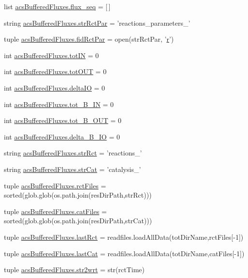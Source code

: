 \begin{DoxyCompactItemize}
\item 
list \hyperlink{a00124_a99cfaccf97d11133896704acd137057d}{acs\-Buffered\-Fluxes.\-flux\-\_\-seq} = \mbox{[}$\,$\mbox{]}
\item 
string \hyperlink{a00124_ac571c8d78a216f58ebc1e37bef25a541}{acs\-Buffered\-Fluxes.\-str\-Rct\-Par} = 'reactions\-\_\-parameters\-\_\-'
\item 
tuple \hyperlink{a00124_af949c46aab0625cd7bbed10b8a484f8b}{acs\-Buffered\-Fluxes.\-fid\-Rct\-Par} = open(str\-Rct\-Par, '\hyperlink{a00031_ac862e7284527eb913b1351c8bfb8e079}{r}')
\item 
int \hyperlink{a00124_a59bf56491943c5f1414e0cc407b48b93}{acs\-Buffered\-Fluxes.\-tot\-I\-N} = 0
\item 
int \hyperlink{a00124_a730efee103fd41819ea5848cec249d07}{acs\-Buffered\-Fluxes.\-tot\-O\-U\-T} = 0
\item 
int \hyperlink{a00124_ae98d1ab06ff5af93de3e406b69c0f890}{acs\-Buffered\-Fluxes.\-delta\-I\-O} = 0
\item 
int \hyperlink{a00124_a9212bb73d018f7f9c7112fc40900335c}{acs\-Buffered\-Fluxes.\-tot\-\_\-\-B\-\_\-\-I\-N} = 0
\item 
int \hyperlink{a00124_a05f604fc532aebf8d9418c9162e2c1b7}{acs\-Buffered\-Fluxes.\-tot\-\_\-\-B\-\_\-\-O\-U\-T} = 0
\item 
int \hyperlink{a00124_a28922506bb13e58a9c49c9191dee3784}{acs\-Buffered\-Fluxes.\-delta\-\_\-\-B\-\_\-\-I\-O} = 0
\item 
string \hyperlink{a00124_a8a10e31ae1f56ead45ef13fe84ba868f}{acs\-Buffered\-Fluxes.\-str\-Rct} = 'reactions\-\_\-'
\item 
string \hyperlink{a00124_acbfee694f1d4745446ad7ed83d1f7494}{acs\-Buffered\-Fluxes.\-str\-Cat} = 'catalysis\-\_\-'
\item 
tuple \hyperlink{a00124_a60a2c6fa1b6a8c5d40a751491ffd04e7}{acs\-Buffered\-Fluxes.\-rct\-Files} = sorted(glob.\-glob(os.\-path.\-join(res\-Dir\-Path,str\-Rct)))
\item 
tuple \hyperlink{a00124_a1d925f94f070fbec1b39c544176b3452}{acs\-Buffered\-Fluxes.\-cat\-Files} = sorted(glob.\-glob(os.\-path.\-join(res\-Dir\-Path,str\-Cat)))
\item 
tuple \hyperlink{a00124_a3f5f644008584b4ae3756ada869a8f03}{acs\-Buffered\-Fluxes.\-last\-Rct} = readfiles.\-load\-All\-Data(tot\-Dir\-Name,rct\-Files\mbox{[}-\/1\mbox{]})
\item 
tuple \hyperlink{a00124_a4b8fcacfa4d1a00c44c22118ca07688a}{acs\-Buffered\-Fluxes.\-last\-Cat} = readfiles.\-load\-All\-Data(tot\-Dir\-Name,cat\-Files\mbox{[}-\/1\mbox{]})
\item 
tuple \hyperlink{a00124_ae3cf837e258f4b4c7f2d2b1118d2ae65}{acs\-Buffered\-Fluxes.\-str2wrt} = str(rct\-Time)
\end{DoxyCompactItemize}
